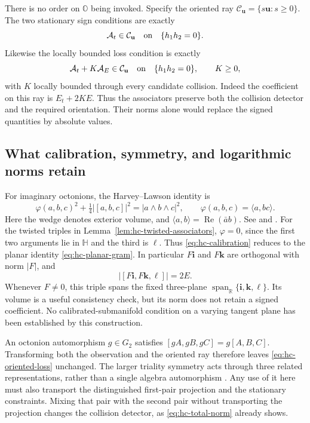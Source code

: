 \documentclass[11pt]{article}
\numberwithin{equation}{section}
\theoremstyle{definition}
\theoremstyle{remark}
\newcommand{\R}{\mathbb R}
\newcommand{\HH}{\mathbb H}
\newcommand{\OO}{\mathbb O}
\newcommand{\ii}{\mathbf i}
\newcommand{\kk}{\mathbf k}
\DeclareMathOperator{\Rea}{Re}
\begin{document}
There is no order on \(\OO\) being invoked. Specify the oriented ray
\(\mathcal C_{\mathbf u}=\{s\mathbf u:s\ge0\}\).
The two stationary sign conditions are exactly
\begin{equation}
 \mathcal A_t\in\mathcal C_{\mathbf u}
          \quad\hbox{on}\quad\{h_1h_2=0\}.
 \label{eq:hc-oriented-sign}
\end{equation}
Likewise the locally bounded loss condition is exactly
\begin{equation}
 \mathcal A_t+K\mathcal A_E\in\mathcal C_{\mathbf u}
          \quad\hbox{on}\quad\{h_1h_2=0\},
 \qquad K\ge0,
 \label{eq:hc-oriented-loss}
\end{equation}
with \(K\) locally bounded through every candidate collision. Indeed
the coefficient on this ray is \(E_t+2KE\). Thus the associators
preserve both the collision detector and the required orientation.
Their norms alone would replace the signed quantities by absolute values.

\subsection{What calibration, symmetry, and logarithmic norms retain}

For imaginary octonions, the Harvey--Lawson identity is
\begin{equation}
 \varphi(a,b,c)^2+\tfrac14|[a,b,c]|^2=|a\wedge b\wedge c|^2,
 \qquad \varphi(a,b,c)=\langle a,bc\rangle.
 \label{eq:hc-calibration}
\end{equation}
Here the wedge denotes exterior volume, and
\(\langle a,b\rangle=\Rea(\bar a b)\).  See
\cite[Chapter IV, Theorem 1.6]{harveylawson} and
\cite[Corollary 3.52]{karigiannis}.  For the twisted triples
in Lemma~\ref{lem:hc-twisted-associators}, \(\varphi=0\), since the
first two arguments lie in \(\HH\) and the third is \(\ell\).
Thus \eqref{eq:hc-calibration} reduces to the planar identity
\eqref{eq:hc-planar-gram}.  In particular \(F\ii\) and \(F\kk\)
are orthogonal with norm \(|F|\), and
\[
 |[F\ii,F\kk,\ell]|=2E.
\]
Whenever \(F\ne0\), this triple spans the fixed three-plane
\(\operatorname{span}_{\R}\{\ii,\kk,\ell\}\).  Its volume is a
useful consistency check, but its norm does not retain a signed
coefficient.  No calibrated-submanifold condition on a varying tangent
plane has been established by this construction.

An octonion automorphism \(g\in G_2\) satisfies
\([gA,gB,gC]=g[A,B,C]\).  Transforming both the observation and the
oriented ray therefore leaves \eqref{eq:hc-oriented-loss} unchanged.
The larger triality symmetry acts through three related
representations, rather than a single algebra automorphism
\cite[Section 2.4]{baez}\cite{schraymanogue}.
Any use of it here must also transport the distinguished first-pair
projection and the stationary constraints.  Mixing that pair with the
second pair without transporting the projection changes the collision
detector, as \eqref{eq:hc-total-norm} already shows.
\end{document}
